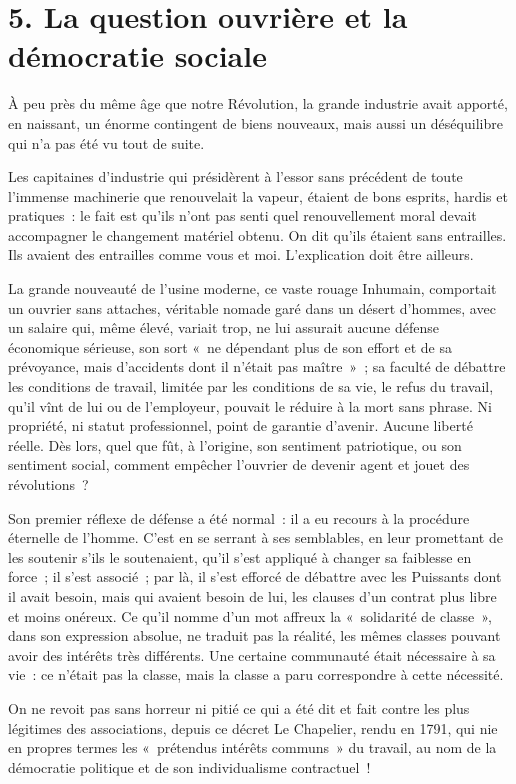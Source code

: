 \documentclass[french,twoside]{book} %
\begin{document}
\section[{5. La question ouvrière et la démocratie sociale}]{5. La question ouvrière et la démocratie sociale}
\noindent À peu près du même âge que notre Révolution, la grande industrie avait apporté, en naissant, un énorme contingent de biens nouveaux, mais aussi un déséquilibre qui n’a pas été vu tout de suite.\par
Les capitaines d’industrie qui présidèrent à l’essor sans précédent de toute l’immense machinerie que renouvelait la vapeur, étaient de bons esprits, hardis et pratiques : le fait est qu’ils n’ont pas senti quel renouvellement moral devait accompagner le changement matériel obtenu. On dit qu’ils étaient sans entrailles. Ils avaient des entrailles comme vous et moi. L’explication doit être ailleurs.\par
La grande nouveauté de l’usine moderne, ce vaste rouage Inhumain, comportait un ouvrier sans attaches, véritable nomade garé dans un désert d’hommes, avec un salaire qui, même élevé, variait trop, ne lui assurait aucune défense économique sérieuse, son sort « ne dépendant plus de son effort et de sa prévoyance, mais d’accidents dont il n’était pas maître » ; sa faculté de débattre les conditions de travail, limitée par les conditions de sa vie, le refus du travail, qu’il vînt de lui ou de l’employeur, pouvait le réduire à la mort sans phrase. Ni propriété, ni statut professionnel, point de garantie d’avenir. Aucune liberté réelle. Dès lors, quel que fût, à l’origine, son sentiment patriotique, ou son sentiment social, comment empêcher l’ouvrier de devenir agent et jouet des révolutions ?\par
Son premier réflexe de défense a été normal : il a eu recours à la procédure éternelle de l’homme. C’est en se serrant à ses semblables, en leur promettant de les soutenir s’ils le soutenaient, qu’il s’est appliqué à changer sa faiblesse en force ; il s’est associé ; par là, il s’est efforcé de débattre avec les Puissants dont il avait besoin, mais qui avaient besoin de lui, les clauses d’un contrat plus libre et moins onéreux. Ce qu’il nomme d’un mot affreux la « solidarité de classe », dans son expression absolue, ne traduit pas la réalité, les mêmes classes pouvant avoir des intérêts très différents. Une certaine communauté était nécessaire à sa vie : ce n’était pas la classe, mais la classe a paru correspondre à cette nécessité.\par
On ne revoit pas sans horreur ni pitié ce qui a été dit et fait contre les plus légitimes des associations, depuis ce décret Le Chapelier, rendu en 1791, qui nie en propres termes les « prétendus intérêts communs » du travail, au nom de la démocratie politique et de son individualisme contractuel !\par
\end{document}
